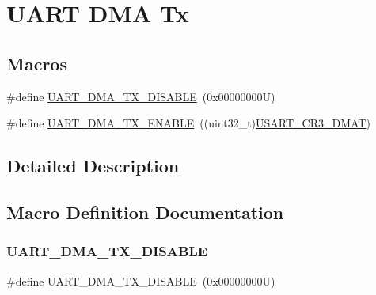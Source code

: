 \hypertarget{group___u_a_r_t___d_m_a___tx}{}\section{U\+A\+RT D\+MA Tx}
\label{group___u_a_r_t___d_m_a___tx}
\subsection*{Macros}
\begin{DoxyCompactItemize}
\item 
\#define \hyperlink{group___u_a_r_t___d_m_a___tx_gaa318cc9c1aa55acc5bb93f378ac7d8e4}{U\+A\+R\+T\+\_\+\+D\+M\+A\+\_\+\+T\+X\+\_\+\+D\+I\+S\+A\+B\+LE}~(0x00000000\+U)
\item 
\#define \hyperlink{group___u_a_r_t___d_m_a___tx_gab1c3e8113617fb9c8fc63b3f3d7c8c65}{U\+A\+R\+T\+\_\+\+D\+M\+A\+\_\+\+T\+X\+\_\+\+E\+N\+A\+B\+LE}~((uint32\+\_\+t)\hyperlink{group___peripheral___registers___bits___definition_ga5bb515d3814d448f84e2c98bf44f3993}{U\+S\+A\+R\+T\+\_\+\+C\+R3\+\_\+\+D\+M\+AT})
\end{DoxyCompactItemize}


\subsection{Detailed Description}


\subsection{Macro Definition Documentation}
\mbox{\label{group___u_a_r_t___d_m_a___tx_gaa318cc9c1aa55acc5bb93f378ac7d8e4}} 
\subsubsection{\texorpdfstring{U\+A\+R\+T\+\_\+\+D\+M\+A\+\_\+\+T\+X\+\_\+\+D\+I\+S\+A\+B\+LE}{UART\_DMA\_TX\_DISABLE}}
{\footnotesize\ttfamily \#define U\+A\+R\+T\+\_\+\+D\+M\+A\+\_\+\+T\+X\+\_\+\+D\+I\+S\+A\+B\+LE~(0x00000000\+U)}

